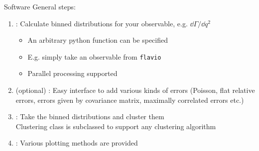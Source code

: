\begin{frame}{Software}
	General steps:
	\begin{enumerate}
		\item {}: Calculate binned distributions for your observable, e.g. $\dd\Gamma/\dd q^2$
		\begin{itemize}
			\item An arbitrary python function can be specified
			\item E.g. simply take an observable from \texttt{flavio}
			\item Parallel processing supported
		\end{itemize}
		\item (optional) : Easy interface to add various kinds of errors {\footnotesize(Poisson, flat relative errors, errors given by covariance matrix, maximally correlated errors etc.)}
		\item {}: Take the binned distributions and cluster them\\
		{\footnotesize Clustering class is subclassed to support any clustering algorithm}
		\item {}: Various plotting methods are provided
	\end{enumerate}
\end{frame}

